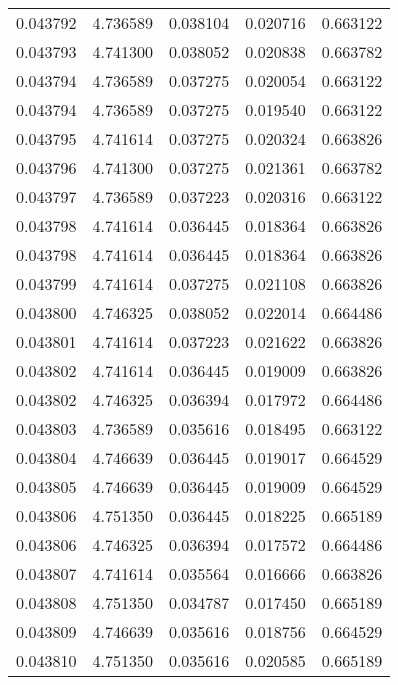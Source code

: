 \begin{tabular}{lrrrr}
0.043792    &  4.736589 &  0.038104 &  0.020716 &             0.663122 \\
0.043793    &  4.741300 &  0.038052 &  0.020838 &             0.663782 \\
0.043794    &  4.736589 &  0.037275 &  0.020054 &             0.663122 \\
0.043794    &  4.736589 &  0.037275 &  0.019540 &             0.663122 \\
0.043795    &  4.741614 &  0.037275 &  0.020324 &             0.663826 \\
0.043796    &  4.741300 &  0.037275 &  0.021361 &             0.663782 \\
0.043797    &  4.736589 &  0.037223 &  0.020316 &             0.663122 \\
0.043798    &  4.741614 &  0.036445 &  0.018364 &             0.663826 \\
0.043798    &  4.741614 &  0.036445 &  0.018364 &             0.663826 \\
0.043799    &  4.741614 &  0.037275 &  0.021108 &             0.663826 \\
0.043800    &  4.746325 &  0.038052 &  0.022014 &             0.664486 \\
0.043801    &  4.741614 &  0.037223 &  0.021622 &             0.663826 \\
0.043802    &  4.741614 &  0.036445 &  0.019009 &             0.663826 \\
0.043802    &  4.746325 &  0.036394 &  0.017972 &             0.664486 \\
0.043803    &  4.736589 &  0.035616 &  0.018495 &             0.663122 \\
0.043804    &  4.746639 &  0.036445 &  0.019017 &             0.664529 \\
0.043805    &  4.746639 &  0.036445 &  0.019009 &             0.664529 \\
0.043806    &  4.751350 &  0.036445 &  0.018225 &             0.665189 \\
0.043806    &  4.746325 &  0.036394 &  0.017572 &             0.664486 \\
0.043807    &  4.741614 &  0.035564 &  0.016666 &             0.663826 \\
0.043808    &  4.751350 &  0.034787 &  0.017450 &             0.665189 \\
0.043809    &  4.746639 &  0.035616 &  0.018756 &             0.664529 \\
0.043810    &  4.751350 &  0.035616 &  0.020585 &             0.665189 \\

\end{tabular}
